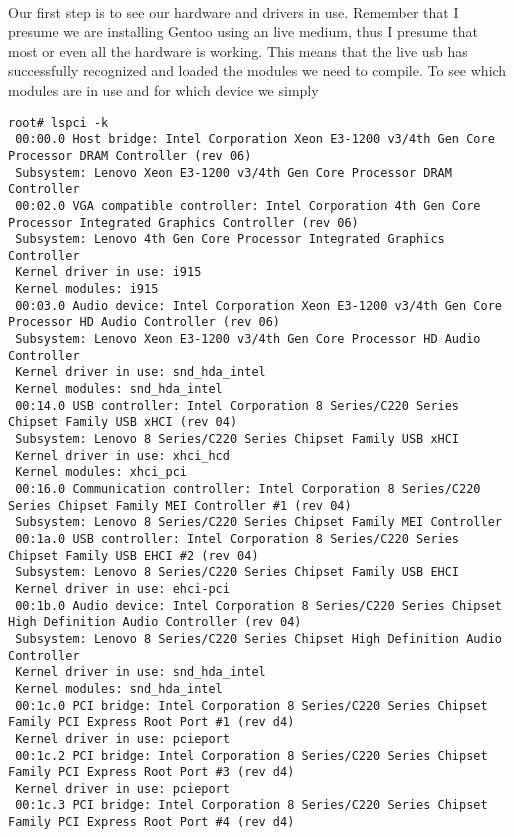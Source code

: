\documentclass[10pt,a4paper]{article}
\begin{document}
                \paragraph{} Our first step is to see our hardware and drivers in use. Remember that I presume we are installing Gentoo using an live medium, thus I presume that most or even all the hardware is working. This means that the live usb has successfully recognized and loaded the modules we need to compile. To see which modules are in use and for which device we simply

                \begin{lstlisting}[style=BashInputRoot]
 root# lspci -k
 00:00.0 Host bridge: Intel Corporation Xeon E3-1200 v3/4th Gen Core Processor DRAM Controller (rev 06)
 Subsystem: Lenovo Xeon E3-1200 v3/4th Gen Core Processor DRAM Controller
 00:02.0 VGA compatible controller: Intel Corporation 4th Gen Core Processor Integrated Graphics Controller (rev 06)
 Subsystem: Lenovo 4th Gen Core Processor Integrated Graphics Controller
 Kernel driver in use: i915
 Kernel modules: i915
 00:03.0 Audio device: Intel Corporation Xeon E3-1200 v3/4th Gen Core Processor HD Audio Controller (rev 06)
 Subsystem: Lenovo Xeon E3-1200 v3/4th Gen Core Processor HD Audio Controller
 Kernel driver in use: snd_hda_intel
 Kernel modules: snd_hda_intel
 00:14.0 USB controller: Intel Corporation 8 Series/C220 Series Chipset Family USB xHCI (rev 04)
 Subsystem: Lenovo 8 Series/C220 Series Chipset Family USB xHCI
 Kernel driver in use: xhci_hcd
 Kernel modules: xhci_pci
 00:16.0 Communication controller: Intel Corporation 8 Series/C220 Series Chipset Family MEI Controller #1 (rev 04)
 Subsystem: Lenovo 8 Series/C220 Series Chipset Family MEI Controller
 00:1a.0 USB controller: Intel Corporation 8 Series/C220 Series Chipset Family USB EHCI #2 (rev 04)
 Subsystem: Lenovo 8 Series/C220 Series Chipset Family USB EHCI
 Kernel driver in use: ehci-pci
 00:1b.0 Audio device: Intel Corporation 8 Series/C220 Series Chipset High Definition Audio Controller (rev 04)
 Subsystem: Lenovo 8 Series/C220 Series Chipset High Definition Audio Controller
 Kernel driver in use: snd_hda_intel
 Kernel modules: snd_hda_intel
 00:1c.0 PCI bridge: Intel Corporation 8 Series/C220 Series Chipset Family PCI Express Root Port #1 (rev d4)
 Kernel driver in use: pcieport
 00:1c.2 PCI bridge: Intel Corporation 8 Series/C220 Series Chipset Family PCI Express Root Port #3 (rev d4)
 Kernel driver in use: pcieport
 00:1c.3 PCI bridge: Intel Corporation 8 Series/C220 Series Chipset Family PCI Express Root Port #4 (rev d4)

\end{lstlisting}
\end{document}
